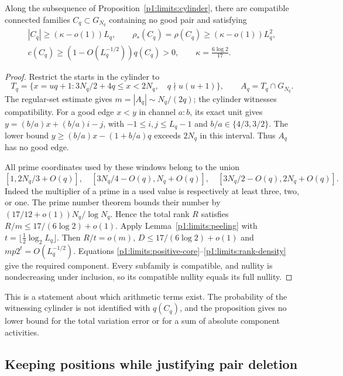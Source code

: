 \begin{proposition}
\label{p1:limits:large-component}
Along the subsequence of Proposition~\ref{p1:limits:cylinder},
there are compatible connected families $C_q\subset G_{N_q}$
containing no good pair and satisfying
\begin{equation}
 \begin{gathered}
 |C_q|\ge(\kappa-o(1))L_q,\qquad
 \rho_*(C_q)=\rho(C_q)\ge(\kappa-o(1))L_q^2,\\
 c(C_q)\ge(1-O(L_q^{-1/2}))q(C_q)>0,\qquad
 \kappa=\frac{6\log2}{17}.
 \end{gathered}
 \label{p1:limits:quadratic-nullity}
\end{equation}
\end{proposition}
\begin{proof}
Restrict the starts in the cylinder to
\[
 T_q=\{x=uq+1:3N_q/2+4q\le x<2N_q,\quad q\nmid u(u+1)\},
 \qquad A_q=T_q\cap G_{N_q}.
\]
The regular-set estimate gives
$m=|A_q|\sim N_q/(2q)$; the cylinder witnesses compatibility.
For a good edge $x<y$ in channel $a:b$, its exact unit gives
$y=(b/a)x+(b/a)i-j$, with $-1\le i,j\le L_q-1$ and
$b/a\in\{4/3,3/2\}$.  The lower bound
$y\ge(b/a)x-(1+b/a)q$ exceeds $2N_q$ in this interval.
Thus $A_q$ has no good edge.

All prime coordinates used by these windows belong to the union
\[
 [1,2N_q/3+O(q)],\quad
 [3N_q/4-O(q),N_q+O(q)],\quad
 [3N_q/2-O(q),2N_q+O(q)].
\]
Indeed the multiplier of a prime in a used value is respectively
at least three, two, or one.  The prime number theorem bounds
their number by $(17/12+o(1))N_q/\log N_q$.
Hence the total rank $R$ satisfies
$R/m\le17/(6\log2)+o(1)$.
Apply Lemma~\ref{p1:limits:peeling} with
$t=\lfloor\frac12\log_2L_q\rfloor$.  Then $R/t=o(m)$,
$D\le17/(6\log2)+o(1)$ and $mp2^t=O(L_q^{-1/2})$.
Equations \eqref{p1:limits:positive-core}--\eqref{p1:limits:rank-density}
give the required component.  Every subfamily is compatible,
and nullity is nondecreasing under inclusion, so its compatible
nullity equals its full nullity.
\end{proof}

This is a statement about which arithmetic terms exist.  The
probability of the witnessing cylinder is not identified with
$q(C_q)$, and the proposition gives no lower bound for the total
variation error or for a sum of absolute component activities.

\subsection{Keeping positions while justifying pair deletion}
\label{p1:limits:positions}
\label{p14:comp:positional-proof}

